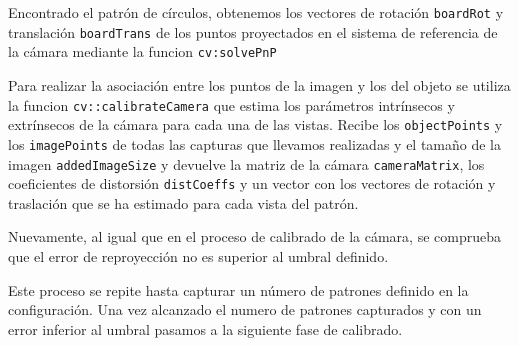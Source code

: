 Encontrado el patrón de círculos, obtenemos los vectores de rotación \texttt{boardRot} y translación \texttt{boardTrans} de los puntos proyectados en el sistema de referencia de la cámara mediante la funcion \texttt{cv:solvePnP}




Para realizar la asociación entre los puntos de la imagen y los del objeto se utiliza la funcion \texttt{cv::calibrateCamera} que estima los parámetros intrínsecos y extrínsecos de la cámara para cada una de las vistas. Recibe los \texttt{objectPoints} y los \texttt{imagePoints} de todas las capturas que llevamos realizadas y el tamaño de la imagen \texttt{addedImageSize} y devuelve la matriz de la cámara \texttt{cameraMatrix}, los coeficientes de distorsión \texttt{distCoeffs} y un vector con los vectores de rotación y traslación que se ha estimado para cada vista del patrón. 



Nuevamente, al igual que en el proceso de calibrado de la cámara, se comprueba que el error de reproyección no es superior al umbral definido.

Este proceso se repite hasta capturar un número de patrones definido en la configuración. Una vez alcanzado el numero de patrones capturados y con un error inferior al umbral pasamos a la siguiente fase de calibrado.

